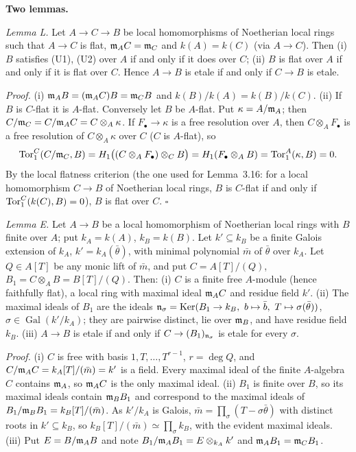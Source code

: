 \documentclass[11pt]{article}
\begin{document}
\textbf{Two lemmas.}

\emph{Lemma L.} Let $A\to C\to B$ be local homomorphisms of Noetherian local rings such that $A\to C$ is flat, $\mathfrak m_AC=\mathfrak m_C$ and $k(A)=k(C)$ (via $A\to C$). Then (i) $B$ satisfies (U1), (U2) over $A$ if and only if it does over $C$; (ii) $B$ is flat over $A$ if and only if it is flat over $C$. Hence $A\to B$ is etale if and only if $C\to B$ is etale.

\emph{Proof.} (i) $\mathfrak m_AB=(\mathfrak m_AC)B=\mathfrak m_CB$ and $k(B)/k(A)=k(B)/k(C)$. (ii) If $B$ is $C$-flat it is $A$-flat. Conversely let $B$ be $A$-flat. Put $\kappa=A/\mathfrak m_A$; then $C/\mathfrak m_C=C/\mathfrak m_AC=C\otimes_A\kappa$. If $F_\bullet\to\kappa$ is a free resolution over $A$, then $C\otimes_AF_\bullet$ is a free resolution of $C\otimes_A\kappa$ over $C$ ($C$ is $A$-flat), so
\[ \operatorname{Tor}_1^C(C/\mathfrak m_C,B)=H_1\bigl((C\otimes_AF_\bullet)\otimes_CB\bigr)=H_1(F_\bullet\otimes_AB)=\operatorname{Tor}_1^A(\kappa,B)=0. \]
By the local flatness criterion (the one used for Lemma~3.16: for a local homomorphism $C\to B$ of Noetherian local rings, $B$ is $C$-flat if and only if $\operatorname{Tor}_1^C(k(C),B)=0$), $B$ is flat over $C$. $\square$

\emph{Lemma E.} Let $A\to B$ be a local homomorphism of Noetherian local rings with $B$ finite over $A$; put $k_A=k(A)$, $k_B=k(B)$. Let $k'\subseteq k_B$ be a finite Galois extension of $k_A$, $k'=k_A(\bar\theta)$, with minimal polynomial $\bar m$ of $\bar\theta$ over $k_A$. Let $Q\in A[T]$ be any monic lift of $\bar m$, and put $C=A[T]/(Q)$, $B_1=C\otimes_AB=B[T]/(Q)$. Then:
(i) $C$ is a finite free $A$-module (hence faithfully flat), a local ring with maximal ideal $\mathfrak m_AC$ and residue field $k'$.
(ii) The maximal ideals of $B_1$ are the ideals $\fn_\sigma=\Ker(B_1\to k_B,\ b\mapsto\bar b,\ T\mapsto\sigma(\bar\theta))$, $\sigma\in\operatorname{Gal}(k'/k_A)$; they are pairwise distinct, lie over $\mathfrak m_B$, and have residue field $k_B$.
(iii) $A\to B$ is etale if and only if $C\to(B_1)_{\mathfrak n_\sigma}$ is etale for every $\sigma$.

\emph{Proof.} (i) $C$ is free with basis $1,T,\dots,T^{r-1}$, $r=\deg Q$, and $C/\mathfrak m_AC=k_A[T]/(\bar m)=k'$ is a field. Every maximal ideal of the finite $A$-algebra $C$ contains $\mathfrak m_A$, so $\mathfrak m_AC$ is the only maximal ideal.
(ii) $B_1$ is finite over $B$, so its maximal ideals contain $\mathfrak m_BB_1$ and correspond to the maximal ideals of $B_1/\mathfrak m_BB_1=k_B[T]/(\bar m)$. As $k'/k_A$ is Galois, $\bar m=\prod_\sigma(T-\sigma\bar\theta)$ with distinct roots in $k'\subseteq k_B$, so $k_B[T]/(\bar m)\simeq\prod_\sigma k_B$, with the evident maximal ideals.
(iii) Put $E=B/\mathfrak m_AB$ and note $B_1/\mathfrak m_AB_1=E\otimes_{k_A}k'$ and $\mathfrak m_AB_1=\mathfrak m_CB_1$.
\end{document}
